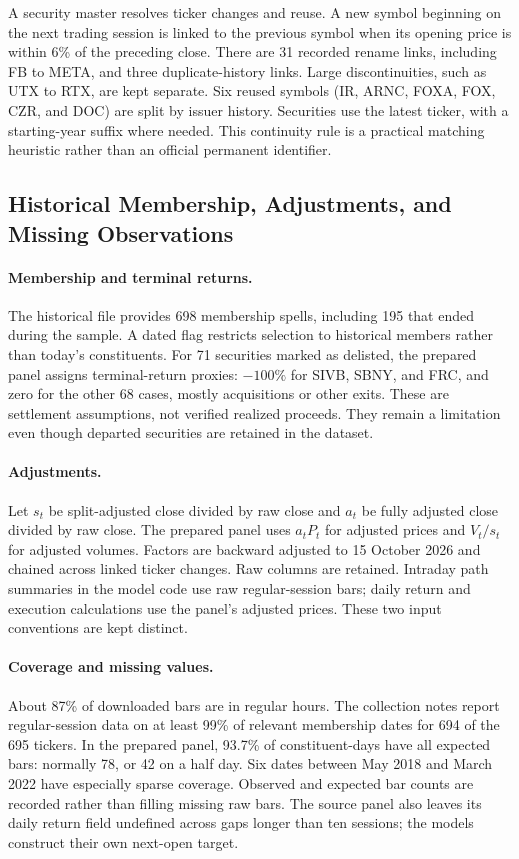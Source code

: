 \documentclass[11pt,a4paper]{article}
\newcommand{\code}[1]{\texttt{\detokenize{#1}}}
\begin{document}
A security master resolves ticker changes and reuse. A new symbol beginning
on the next trading session is linked to the previous symbol when its opening
price is within 6\% of the preceding close. There are 31 recorded rename links,
including FB to META, and three duplicate-history links. Large discontinuities,
such as UTX to RTX, are kept separate. Six reused symbols (IR, ARNC, FOXA, FOX,
CZR, and DOC) are split by issuer history. Securities use the latest ticker,
with a starting-year suffix where needed. This continuity rule is a practical
matching heuristic rather than an official permanent identifier.

\subsection{Historical Membership, Adjustments, and Missing Observations}
\label{sec:data-cleaning}
\paragraph{Membership and terminal returns.}
The historical file provides 698 membership spells, including 195 that ended
during the sample. A dated \code{in_index} flag restricts selection to historical
members rather than today's constituents. For 71 securities marked as delisted,
the prepared panel assigns terminal-return proxies: $-100\%$ for SIVB, SBNY,
and FRC, and zero for the other 68 cases, mostly acquisitions or other exits.
These are settlement assumptions, not verified realized proceeds. They remain
a limitation even though departed securities are retained in the dataset.

\paragraph{Adjustments.}
Let $s_t$ be split-adjusted close divided by raw close and $a_t$ be fully
adjusted close divided by raw close. The prepared panel uses $a_tP_t$ for
adjusted prices and $V_t/s_t$ for adjusted volumes. Factors are backward
adjusted to 15 October 2026 and chained across linked ticker changes.
Raw columns are retained. Intraday path summaries in the model code use raw
regular-session bars; daily return and execution calculations use the
panel's adjusted prices. These two input conventions are kept distinct.

\paragraph{Coverage and missing values.}
About 87\% of downloaded bars are in regular hours. The collection notes
report regular-session data on at least 99\% of relevant membership dates for
694 of the 695 tickers. In the prepared panel, 93.7\% of constituent-days have
all expected bars: normally 78, or 42 on a half day. Six dates between May 2018
and March 2022 have especially sparse coverage. Observed and expected bar
counts are recorded rather than filling missing raw bars. The source panel
also leaves its daily return field undefined across gaps longer than ten
sessions; the models construct their own next-open target.
\end{document}
